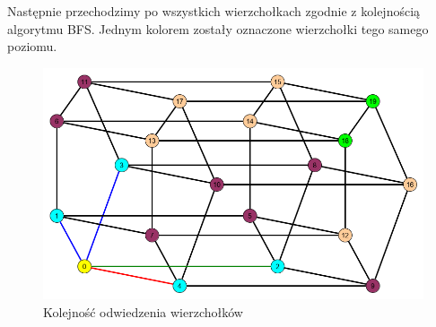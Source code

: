 \documentclass[12pt,a4paper,titlepage]{article}
\newcommand\tab[1][1cm]{\hspace*{#1}}
\begin{document}
\tab[0.6cm]Następnie przechodzimy po wszystkich wierzchołkach zgodnie z kolejnością algorytmu BFS. Jednym kolorem zostały oznaczone wierzchołki tego samego poziomu.
\begin{figure}[h]
\centering
\includegraphics[width = 11.9cm]{kol2.png}
\caption{Kolejność odwiedzenia wierzchołków}
\end{figure}
\\
\\
\end{document}
